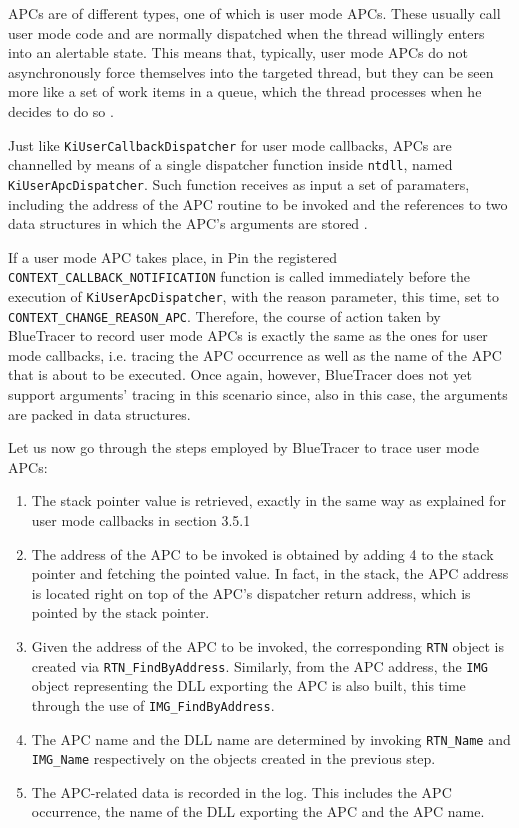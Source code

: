 APCs are of different types, one of which is user mode APCs. These usually call user mode code and are normally dispatched when the thread willingly enters into an alertable state. This means that, typically, user mode APCs do not asynchronously force themselves into the targeted thread, but they can be seen more like a set of work items in a queue, which the thread processes when he decides to do so \cite{APC1}.

Just like \texttt{KiUserCallbackDispatcher} for user mode callbacks, APCs are channelled by means of a single dispatcher function inside \texttt{ntdll}, named \texttt{KiUserApcDispatcher}. Such function receives as input a set of paramaters, including the address of the APC routine to be invoked and the references to two data structures in which the APC's arguments are stored \cite{APC2}.  
 
If a user mode APC takes place, in Pin the registered \texttt{CONTEXT\_CALLBACK\_NOTIFICATION} function is called immediately before the execution of \texttt{KiUserApcDispatcher}, with the reason parameter, this time, set to \texttt{CONTEXT\_CHANGE\_REASON\_APC}. Therefore, the course of action taken by BlueTracer to record user mode APCs is exactly the same as the ones for user mode callbacks, i.e. tracing the APC occurrence as well as the name of the APC that is about to be executed. Once again, however, BlueTracer does not yet support arguments' tracing in this scenario since, also in this case, the arguments are packed in data structures.

Let us now go through the steps employed by BlueTracer to trace user mode APCs:
\begin{enumerate}
\item The stack pointer value is retrieved, exactly in the same way as explained for user mode callbacks in section 3.5.1
\item The address of the APC to be invoked is obtained by adding 4 to the stack pointer and fetching the pointed value. In fact, in the stack, the APC address is located right on top of the APC's dispatcher return address, which is pointed by the stack pointer.
\item Given the address of the APC to be invoked, the corresponding \texttt{RTN} object is created via \texttt{RTN\_FindByAddress}. Similarly, from the APC address, the \texttt{IMG} object representing the DLL exporting the APC is also built, this time through the use of \texttt{IMG\_FindByAddress}.
\item The APC name and the DLL name are determined by invoking \texttt{RTN\_Name} and \texttt{IMG\_Name} respectively on the objects created in the previous step.
\item The APC-related data is recorded in the log. This includes the APC occurrence, the name of the DLL exporting the APC and the APC name. 
\end{enumerate}
 
